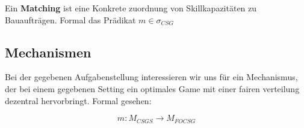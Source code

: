 \begin{definition}[Matching]
  Ein \textbf{Matching} ist eine Konkrete zuordnung von Skillkapazitäten zu Bauaufträgen.
  Formal das Prädikat $m\in\sigma_{CSG}$
\end{definition}



\subsection{Mechanismen}



Bei der gegebenen Aufgabenstellung interessieren wir uns für ein Mechanismus, der bei einem gegebenen Setting ein optimales Game mit einer fairen verteilung dezentral hervorbringt. Formal gesehen:

\begin{equation}
  m: M_{CSGS} \rightarrow M_{FOCSG}
\end{equation}
